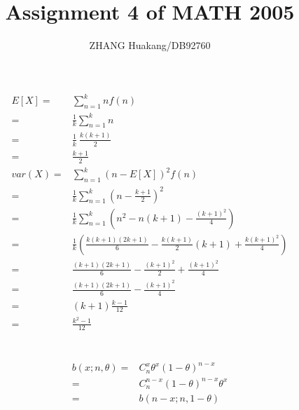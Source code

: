 \documentclass{article}
\title{Assignment 4 of MATH 2005}
\author{ZHANG Huakang/DB92760}
\begin{document}
    \maketitle
    \section{}
    \paragraph{
        \begin{equation*}
            \begin{split}
                E[X]=&\sum_{n=1} ^knf(n)\\
                    =&\frac{1}{k}\sum_{n=1}^k n\\
                    =&\frac{1}{k}\ \frac{k(k+1)}{2}\\
                    =&\frac{k+1}{2}\\
                var(X)=&\sum_{n=1}^k (n-E[X])^2f(n)\\
                    =&\frac{1}{k}\sum_{n=1}^k(n-\frac{k+1}{2})^2\\
                    =&\frac{1}{k}\sum_{n=1}^k(n^2-n(k+1)-\frac{(k+1)^2}{4})\\
                    =&\frac{1}{k}(\frac{k(k+1)(2k+1)}{6}-\frac{k(k+1)}{2}(k+1)+\frac{k(k+1)^2}{4})\\
                    =&\frac{(k+1)(2k+1)}{6}-\frac{(k+1)^2}{2}+\frac{(k+1)^2}{4}\\
                    =&\frac{(k+1)(2k+1)}{6}-\frac{(k+1)^2}{4}\\
                    =&(k+1)\frac{k-1}{12}\\
                    =&\frac{k^2-1}{12}
            \end{split}
        \end{equation*}
    }

    \section{}
    \paragraph{
        \begin{equation*}
            \begin{split}
                b(x;n,\theta)=&C_n^x\theta^x(1-\theta)^{n-x}\\
                    =& C_{n}^{n-x}(1-\theta)^{n-x}\theta^x\\
                    =&b(n-x;n,1-\theta)\\
            \end{split}
        \end{equation*}
    }
\end{document}
